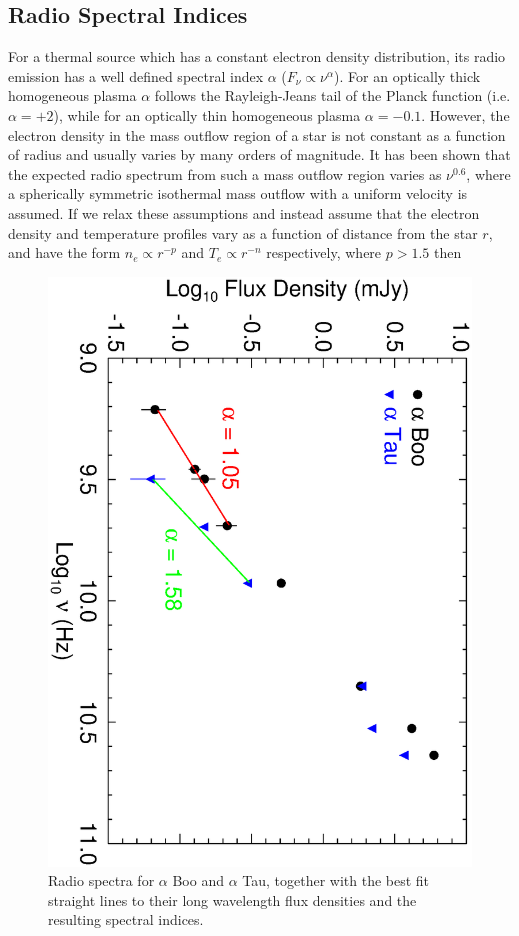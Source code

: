\documentclass[iop]{emulateapj}
\begin{document}
\subsection{Radio Spectral Indices} \label{disc:disc3}
For a thermal source which has a constant electron density distribution, its radio emission has a well defined spectral index $\alpha$ ($F_{\nu} \propto \nu ^{\alpha}$). For an optically thick homogeneous plasma $\alpha$ follows the Rayleigh-Jeans tail of the Planck function (i.e. $\alpha = +2$), while for an optically thin homogeneous plasma $\alpha = -0.1$. However, the electron density in the mass outflow region of a star is not constant as a function of radius and usually varies by many orders of magnitude. It has been shown \citep{1975MNRAS.170...41W,1975AA....39..217O,1975AA....39....1P} that the expected radio spectrum from such a mass outflow region varies as $\nu ^{0.6}$, where a spherically symmetric isothermal mass outflow with a uniform velocity is assumed. If we relax these assumptions and instead assume that the electron density and temperature profiles vary as a function of distance from the star $r$, and have the form $n_{e} \propto r^{-p}$ and $T_{e} \propto r^{-n}$ respectively, where $p > 1.5$ then 

\begin{figure}
\includegraphics[trim = 0mm 0mm 0mm 10mm, clip,scale=0.385,angle=90]{fig3.ps}
\caption{Radio spectra for $\alpha$ Boo and $\alpha$ Tau, together with the best fit straight lines to their long wavelength flux densities and the resulting spectral indices.}
\label{fig:fig3}
\end{figure}
\end{document}
